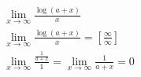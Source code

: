 \begin{ex}
\begin{align}
&\lim_{x\rightarrow \infty} \frac{\log(a+x)}{x}\nonumber\\
&\lim_{x\rightarrow \infty} \frac{\log(a+x)}{x}=\left[\frac{\infty}{\infty}\right]\nonumber\\
&\lim_{x\rightarrow \infty} \frac{\frac{1}{a+x}}{1}=\lim_{x\rightarrow \infty} \frac{1}{a+x}=0\nonumber
\end{align}
\end{ex}